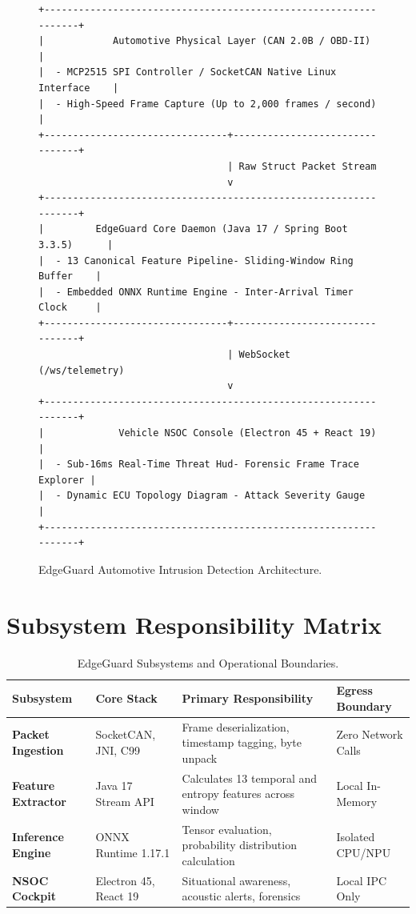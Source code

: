 \documentclass[12pt,a4paper]{report}
\begin{document}
\begin{figure}[htbp]
\centering
\footnotesize
\begin{verbatim}
+-----------------------------------------------------------------+
|            Automotive Physical Layer (CAN 2.0B / OBD-II)        |
|  - MCP2515 SPI Controller / SocketCAN Native Linux Interface    |
|  - High-Speed Frame Capture (Up to 2,000 frames / second)       |
+--------------------------------+--------------------------------+
                                 | Raw Struct Packet Stream
                                 v
+-----------------------------------------------------------------+
|         EdgeGuard Core Daemon (Java 17 / Spring Boot 3.3.5)      |
|  - 13 Canonical Feature Pipeline- Sliding-Window Ring Buffer    |
|  - Embedded ONNX Runtime Engine - Inter-Arrival Timer Clock     |
+--------------------------------+--------------------------------+
                                 | WebSocket (/ws/telemetry)
                                 v
+-----------------------------------------------------------------+
|             Vehicle NSOC Console (Electron 45 + React 19)       |
|  - Sub-16ms Real-Time Threat Hud- Forensic Frame Trace Explorer |
|  - Dynamic ECU Topology Diagram - Attack Severity Gauge         |
+-----------------------------------------------------------------+
\end{verbatim}
\caption{EdgeGuard Automotive Intrusion Detection Architecture.}
\label{fig:edgeguard_topology}
\end{figure}

\section{Subsystem Responsibility Matrix}

\begin{table}[htbp]
\centering
\small
\begin{tabularx}{\linewidth}{>{\raggedright\arraybackslash\bfseries}p{2.3cm}>{\raggedright\arraybackslash}X>{\raggedright\arraybackslash}X>{\raggedright\arraybackslash}p{2.0cm}}
\toprule
Subsystem & Core Stack & Primary Responsibility & Egress Boundary \\
\midrule
Packet Ingestion & SocketCAN, JNI, C99 & Frame deserialization, timestamp tagging, byte unpack & Zero Network Calls \\
\addlinespace
Feature Extractor & Java 17 Stream API & Calculates 13 temporal and entropy features across window & Local In-Memory \\
\addlinespace
Inference Engine & ONNX Runtime 1.17.1 & Tensor evaluation, probability distribution calculation & Isolated CPU/NPU \\
\addlinespace
NSOC Cockpit & Electron 45, React 19 & Situational awareness, acoustic alerts, forensics & Local IPC Only \\
\bottomrule
\end{tabularx}
\caption{EdgeGuard Subsystems and Operational Boundaries.}
\label{tab:edgeguard_subsystems}
\end{table}
\end{document}
